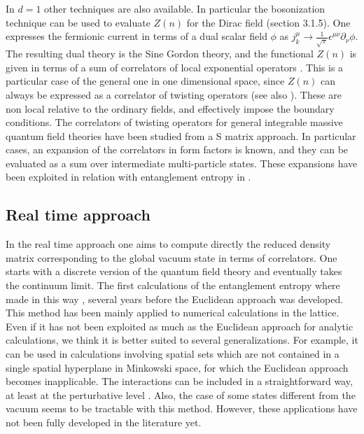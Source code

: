 \documentclass[11pt]{article}
\begin{document}
In $d=1$ other techniques are also available. In particular the bosonization technique can be used to evaluate $Z(n)$ for the Dirac field (section 3.1.5). One expresses the fermionic current in terms of a dual scalar field $\phi$ as $j_{k}^{\mu }\to \frac{1}{\sqrt{\pi }}\epsilon ^{\mu \nu }\partial_{\nu}\phi$.
The resulting dual theory is the Sine Gordon theory, and the functional $Z(n)$ is given in terms of a sum of  correlators of local exponential operators \cite{fermion}. 
This is a particular case of the general one in one dimensional space, since $Z(n)$ can always be expressed as a correlator of twisting operators \cite{ccd} (see also \cite{cg}). These are non local relative to the ordinary fields, and effectively impose the boundary conditions. The correlators of twisting operators for general integrable massive quantum field theories have been studied  from a S matrix approach. In particular cases, an expansion of the correlators in form factors is known, and they can be evaluated as a sum over intermediate multi-particle states. These expansions have been exploited in relation with entanglement entropy in \cite{dc,ccd,d1}.




\subsection{Real time approach}
 In the real time approach one aims to compute directly the reduced density matrix corresponding to the global vacuum state in terms of correlators. One starts with a discrete version of the quantum field theory and eventually takes the continuum limit. 
The first calculations of the entanglement entropy where made in this way \cite{bombelli}, several years before the Euclidean approach was developed. This method has been mainly applied to numerical calculations in the lattice. Even if it has not been exploited as much as the Euclidean approach for analytic calculations, we think it is better suited to several generalizations. For example, it can be used in  calculations involving spatial sets which are not contained in a single spatial hyperplane in Minkowski space, for which the Euclidean approach becomes inapplicable. The interactions can be included in a straightforward way, at least at the perturbative level \cite{v1}. Also, the case of some states different from the vacuum seems to be tractable with this method. However, these applications have not been fully developed in the literature yet.
 
\end{document}
